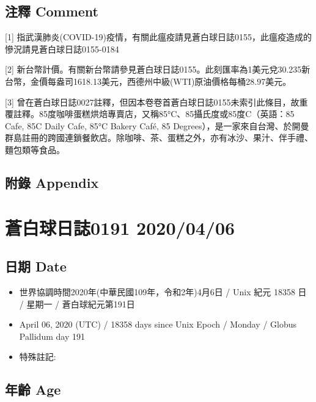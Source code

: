 \documentclass[a5paper, 12pt
]{book}
\providecommand{\tightlist}{%
  \setlength{\itemsep}{0pt}\setlength{\parskip}{0pt}}
\begin{document}
\hypertarget{ux6ce8ux91cb-comment-35}{%
\subsection{注釋 Comment}\label{ux6ce8ux91cb-comment-35}}

{[}1{]}
指武漢肺炎(COVID-19)疫情，有關此瘟疫請見蒼白球日誌0155，此瘟疫造成的慘況請見蒼白球日誌0155-0184

{[}2{]}
新台幣計價。有關新台幣請參見蒼白球日誌0155。此刻匯率為1美元兌30.235新台幣，金價每盎司1618.13美元，西德州中級(WTI)原油價格每桶28.97美元。

{[}3{]}
曾在蒼白球日誌0027註釋，但因本卷卷首蒼白球日誌0155未索引此條目，故重覆註釋。85度咖啡蛋糕烘焙專賣店，又稱85°C、85攝氏度或85度C（英語：85
Cafe, 85C Daily Cafe, 85°C Bakery Café, 85
Degrees），是一家來自台灣、於開曼群島註冊的跨國連鎖餐飲店。除咖啡、茶、蛋糕之外，亦有冰沙、果汁、伴手禮、麵包類等食品。

\hypertarget{ux9644ux9304-appendix-35}{%
\subsection{附錄 Appendix}\label{ux9644ux9304-appendix-35}}

\hypertarget{ux84bcux767dux7403ux65e5ux8a8c0191-20200406}{%
\section{蒼白球日誌0191
2020/04/06}\label{ux84bcux767dux7403ux65e5ux8a8c0191-20200406}}

\hypertarget{ux65e5ux671f-date-36}{%
\subsection{日期 Date}\label{ux65e5ux671f-date-36}}

\begin{itemize}
\tightlist
\item
  世界協調時間2020年(中華民國109年，令和2年)4月6日 / Unix 紀元 18358 日
  / 星期一 / 蒼白球紀元第191日
\item
  April 06, 2020 (UTC) / 18358 days since Unix Epoch / Monday / Globus
  Pallidum day 191
\item
  特殊註記:
\end{itemize}

\hypertarget{ux5e74ux9f61-age-36}{%
\subsection{年齡 Age}\label{ux5e74ux9f61-age-36}}
\end{document}
